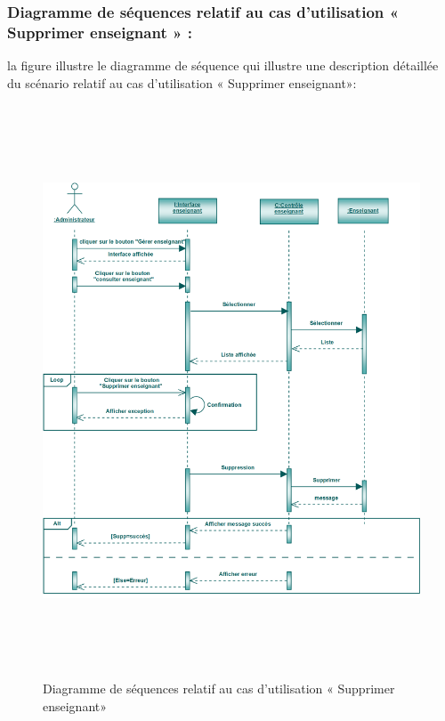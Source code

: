 \documentclass[12 pt ]{report}
\begin{document}
\subsubsection{Diagramme de séquences relatif au cas d’utilisation « Supprimer enseignant » :}
la figure   illustre le diagramme de séquence qui illustre une description détaillée du scénario relatif au cas d’utilisation «  Supprimer enseignant»: 
\begin{figure}[h]
 \begin{center}
\includegraphics[width= 18cm ,height=  17cm]{sec_sup_ens.PNG}
\caption{Diagramme de séquences relatif au cas d’utilisation « Supprimer enseignant»}

\end{center}
\end{figure}
\newpage
\end{document}
